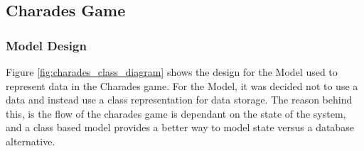 \subsection{Charades Game}
\subsubsection{Model Design}
\begin{figure}[h!]
\end{figure}

Figure \ref{fig:charades_class_diagram} shows the design for the Model used to represent data in the Charades game. For the Model, it was decided not to use a data and instead use a class representation for data storage. The reason behind this, is the  flow of the charades game is dependant on the state of the system, and a class based model provides a better way to model state versus a database alternative.

